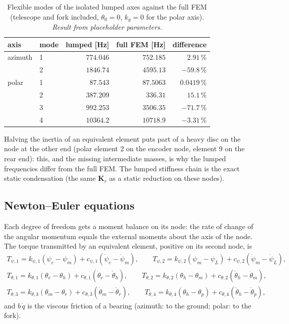 \documentclass[10pt,a4paper]{article}
\numberwithin{equation}{section}
\begin{document}
\begin{table}[H]\centering\small
\caption{Flexible modes of the isolated lumped axes against the full FEM (telescope and fork included, $\theta_0 = 0$, $k_g = 0$ for the polar axis). \emph{Result from placeholder parameters.}}\label{tab:lump_freq}
\begin{tabular}{llrrr}\toprule
axis & mode & lumped [Hz] & full FEM [Hz] & difference \\ \midrule
azimuth & 1 & $774.046$ & $752.185$ & $2.91\,\%$ \\
 & 2 & $1846.74$ & $4595.13$ & $-59.8\,\%$ \\
polar & 1 & $87.543$ & $87.5063$ & $0.0419\,\%$ \\
 & 2 & $387.209$ & $336.31$ & $15.1\,\%$ \\
 & 3 & $992.253$ & $3506.35$ & $-71.7\,\%$ \\
 & 4 & $10364.2$ & $10718.9$ & $-3.31\,\%$ \\
\bottomrule\end{tabular}\end{table}
Halving the inertia of an equivalent element puts part of a heavy disc on the node at the other end (polar element 2 on the encoder node, element 9 on the rear end): this, and the missing intermediate masses, is why the lumped frequencies differ from the full FEM. The lumped stiffness chain is the exact static condensation (the same $\mathbf K_r$ as a static reduction on these nodes).
\subsection{Newton--Euler equations}\label{subsec:lump_ne}
Each degree of freedom gets a moment balance on its node: the rate of change of the angular momentum equals the external moments about the axis of the node. The torque transmitted by an equivalent element, positive on its second node, is
\begin{gather}
T_{\psi,1} = k_{\psi,1}(\psi_e - \psi_m) + c_{\psi,1}(\dot\psi_e - \dot\psi_m),\qquad T_{\psi,2} = k_{\psi,2}(\psi_m - \psi_L) + c_{\psi,2}(\dot\psi_m - \dot\psi_L),\\
T_{\theta,1} = k_{\theta,1}(\theta_e - \theta_h) + c_{\theta,1}(\dot\theta_e - \dot\theta_h),\qquad T_{\theta,2} = k_{\theta,2}(\theta_h - \theta_m) + c_{\theta,2}(\dot\theta_h - \dot\theta_m),\\ T_{\theta,3} = k_{\theta,3}(\theta_m - \theta_r) + c_{\theta,3}(\dot\theta_m - \dot\theta_r),\qquad T_{\theta,4} = k_{\theta,4}(\theta_h - \theta_p) + c_{\theta,4}(\dot\theta_h - \dot\theta_p),
\end{gather}
and $b\,\dot q$ is the viscous friction of a bearing (azimuth: to the ground; polar: to the fork).
\end{document}
